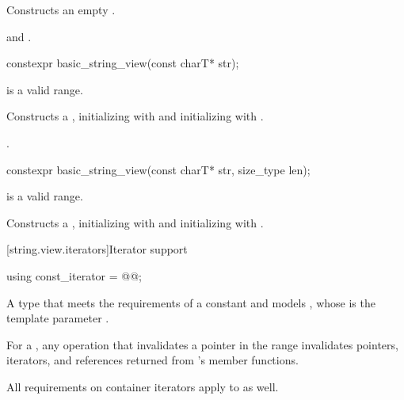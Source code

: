 \begin{itemdescr}
\pnum
\effects
Constructs an empty .

\pnum
\ensures
{} and .
\end{itemdescr}

%
\begin{itemdecl}
constexpr basic_string_view(const charT* str);
\end{itemdecl}

\begin{itemdescr}
\pnum
\expects
{} is a valid range.

\pnum
\effects
Constructs a , initializing  with 
and initializing  with .

\pnum
\complexity
{}.
\end{itemdescr}

%
\begin{itemdecl}
constexpr basic_string_view(const charT* str, size_type len);
\end{itemdecl}

\begin{itemdescr}
\pnum
\expects
{} is a valid range.

\pnum
\effects
Constructs a , initializing  with 
and initializing  with .
\end{itemdescr}

[string.view.iterators]{Iterator support}

%
\begin{itemdecl}
using const_iterator = @@;
\end{itemdecl}

\begin{itemdescr}
\pnum
A type that meets the requirements
of a constant
 and
models ,
whose  is the template parameter .

\pnum
For a , any operation that invalidates a pointer in the range  invalidates pointers, iterators, and references returned from 's member functions.

\pnum
All requirements on container iterators apply to  as well.
\end{itemdescr}

